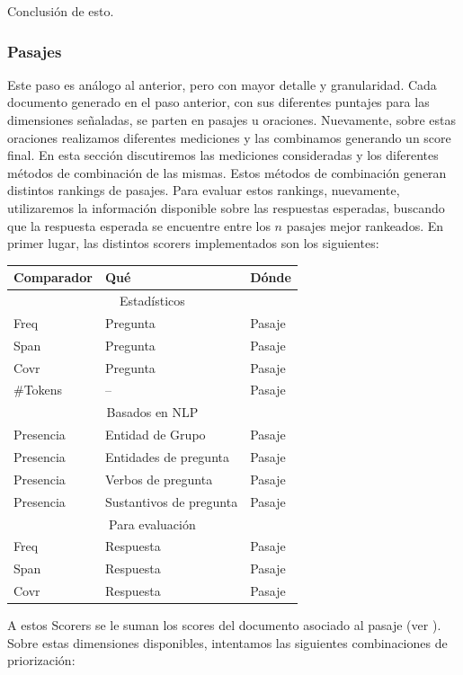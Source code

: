 Conclusión de esto.

\subsubsection{Pasajes}
Este paso es análogo al anterior, pero con mayor detalle y granularidad. Cada documento generado en el paso anterior, con sus diferentes puntajes para 
las dimensiones señaladas, se parten en pasajes u oraciones. Nuevamente, sobre estas oraciones realizamos diferentes mediciones y las combinamos generando
un score final. En esta sección discutiremos las mediciones consideradas y los diferentes métodos de combinación de las mismas. Estos métodos de combinación generan distintos rankings de pasajes. Para evaluar estos rankings, nuevamente, utilizaremos la información disponible sobre las respuestas esperadas, buscando que la respuesta esperada se encuentre entre los $n$ pasajes mejor rankeados.
En primer lugar, las distintos scorers implementados son los siguientes:

\begin{center}
\begin{tabular}{| l | l | l |}
\hline
Comparador & Qué & Dónde \\ \hline
\multicolumn{3}{|c|}{Estadísticos} \\ \hline
Freq & Pregunta & Pasaje \\ \hline
Span & Pregunta & Pasaje \\ \hline
Covr & Pregunta & Pasaje \\ \hline
\#Tokens & -- & Pasaje \\ \hline
\multicolumn{3}{|c|}{Basados en NLP} \\ \hline
Presencia & Entidad de Grupo & Pasaje \\ \hline
Presencia & Entidades de pregunta & Pasaje \\ \hline
Presencia & Verbos de pregunta & Pasaje \\ \hline
Presencia & Sustantivos de pregunta & Pasaje \\ \hline
\multicolumn{3}{|c|}{Para evaluación} \\ \hline
Freq & Respuesta & Pasaje \\ \hline
Span & Respuesta & Pasaje \\ \hline
Covr & Respuesta & Pasaje \\ \hline
\end{tabular}
\end{center}

A estos Scorers se le suman los scores del documento asociado al pasaje (ver ). 
Sobre estas dimensiones disponibles, intentamos las siguientes combinaciones de priorización:

